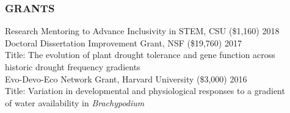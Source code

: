 \documentclass[12pt,english]{article}
\begin{document}

\subsubsection*{GRANTS}
\vspace{-0.5ex}
\hspace*{1.0em} Research Mentoring to Advance Inclusivity in STEM, CSU (\$1,160)
\hfill
2018\vspace{1ex}\\
\hspace*{1.0em} Doctoral Dissertation Improvement Grant, NSF (\$19,760)
\hfill
2017\\
\hspace*{2.0em} Title: The evolution of plant drought tolerance and gene function across\\
\hspace*{2.0em} historic drought frequency gradients
\vspace{1ex}\\
\hspace*{1.0em} Evo-Devo-Eco Network Grant, Harvard University (\$3,000)
\hfill
2016\\
\hspace*{2.0em} Title: Variation  in  developmental  and  physiological  responses  to  a  gradient\\ \hspace*{2.0em} of water availability in \textit{Brachypodium}
\vspace{1ex}

\end{document}
